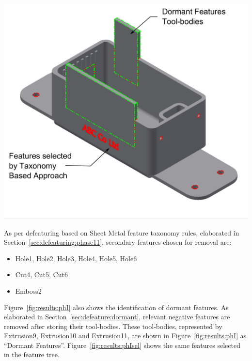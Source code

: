 \begin{minipage}{\linewidth}
\begin{minipage}[c]{0.62\linewidth}
\includegraphics[width=\linewidth,valign=t]{images/SheetMetal_Medium_Enclosure_PhaseISelections_3}
 \label{fig:results:phI}

As per defeaturing based on Sheet Metal feature taxonomy rules, elaborated in Section~\ref{sec:defeaturing:phase11}, secondary features chosen for removal are:

\begin{itemize}[noitemsep,topsep=2pt,parsep=2pt,partopsep=2pt]
\item Hole1, Hole2, Hole3, Hole4, Hole5, Hole6
\item Cut4, Cut5, Cut6
\item Emboss2
\end{itemize}

Figure~\ref{fig:results:phI} also shows the identification of dormant features. As elaborated in Section~\ref{sec:defeature:dormant}, relevant negative features are removed after storing their tool-bodies. These tool-bodies, represented by Extrusion9, Extrusion10 and Extrusion11, are shown in Figure~\ref{fig:results:phI} as ``Dormant Features''. Figure~\ref{fig:results:phIsel} shows the same features selected in the feature tree.


\end{minipage}
\end{minipage}
